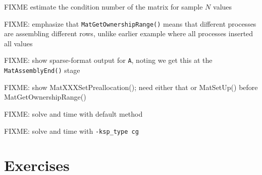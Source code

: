 FIXME estimate the condition number of the matrix for sample $N$ values


FIXME: emphasize that \texttt{MatGetOwnershipRange()} means that different processes are assembling different rows, unlike earlier example where all processes inserted all values



FIXME: show sparse-format output for \texttt{A}, noting we get this at the \texttt{MatAssemblyEnd()} stage %

FIXME: show MatXXXSetPreallocation(); need either that or MatSetUp() before MatGetOwnershipRange()

FIXME: solve and time with default method

FIXME: solve and time with \texttt{-ksp\_type cg}


\section{Exercises}

